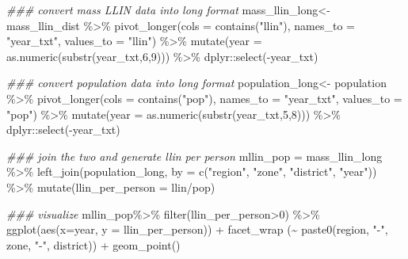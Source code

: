 \documentclass[
  letterpaper,
  DIV=11,
  numbers=noendperiod]{scrreprt}
\newenvironment{Shaded}{\begin{snugshade}}{\end{snugshade}}
\newcommand{\AttributeTok}[1]{\textcolor[rgb]{0.40,0.45,0.13}{#1}}
\newcommand{\DecValTok}[1]{\textcolor[rgb]{0.68,0.00,0.00}{#1}}
\newcommand{\DocumentationTok}[1]{\textcolor[rgb]{0.37,0.37,0.37}{\textit{#1}}}
\newcommand{\FunctionTok}[1]{\textcolor[rgb]{0.28,0.35,0.67}{#1}}
\newcommand{\NormalTok}[1]{\textcolor[rgb]{0.00,0.23,0.31}{#1}}
\newcommand{\OtherTok}[1]{\textcolor[rgb]{0.00,0.23,0.31}{#1}}
\newcommand{\SpecialCharTok}[1]{\textcolor[rgb]{0.37,0.37,0.37}{#1}}
\newcommand{\StringTok}[1]{\textcolor[rgb]{0.13,0.47,0.30}{#1}}
\begin{document}
\begin{Shaded}
\begin{Highlighting}[]
\DocumentationTok{\#\#\# convert mass LLIN data into long format}
\NormalTok{mass\_llin\_long}\OtherTok{\textless{}{-}}\NormalTok{ mass\_llin\_dist }\SpecialCharTok{\%\textgreater{}\%}
  \FunctionTok{pivot\_longer}\NormalTok{(}\AttributeTok{cols =} \FunctionTok{contains}\NormalTok{(}\StringTok{"llin"}\NormalTok{), }\AttributeTok{names\_to =} \StringTok{"year\_txt"}\NormalTok{, }\AttributeTok{values\_to =} \StringTok{"llin"}\NormalTok{) }\SpecialCharTok{\%\textgreater{}\%}
  \FunctionTok{mutate}\NormalTok{(}\AttributeTok{year =} \FunctionTok{as.numeric}\NormalTok{(}\FunctionTok{substr}\NormalTok{(year\_txt,}\DecValTok{6}\NormalTok{,}\DecValTok{9}\NormalTok{))) }\SpecialCharTok{\%\textgreater{}\%}
\NormalTok{  dplyr}\SpecialCharTok{::}\FunctionTok{select}\NormalTok{(}\SpecialCharTok{{-}}\NormalTok{year\_txt)}

\DocumentationTok{\#\#\# convert population data into long format}
\NormalTok{population\_long}\OtherTok{\textless{}{-}}\NormalTok{ population }\SpecialCharTok{\%\textgreater{}\%}
  \FunctionTok{pivot\_longer}\NormalTok{(}\AttributeTok{cols =} \FunctionTok{contains}\NormalTok{(}\StringTok{"pop"}\NormalTok{), }\AttributeTok{names\_to =} \StringTok{"year\_txt"}\NormalTok{, }\AttributeTok{values\_to =} \StringTok{"pop"}\NormalTok{) }\SpecialCharTok{\%\textgreater{}\%}
  \FunctionTok{mutate}\NormalTok{(}\AttributeTok{year =} \FunctionTok{as.numeric}\NormalTok{(}\FunctionTok{substr}\NormalTok{(year\_txt,}\DecValTok{5}\NormalTok{,}\DecValTok{8}\NormalTok{))) }\SpecialCharTok{\%\textgreater{}\%}
\NormalTok{  dplyr}\SpecialCharTok{::}\FunctionTok{select}\NormalTok{(}\SpecialCharTok{{-}}\NormalTok{year\_txt)}

\DocumentationTok{\#\#\# join the two and generate llin per person}
\NormalTok{  mllin\_pop }\OtherTok{=}\NormalTok{ mass\_llin\_long }\SpecialCharTok{\%\textgreater{}\%}
  \FunctionTok{left\_join}\NormalTok{(population\_long, }\AttributeTok{by =} \FunctionTok{c}\NormalTok{(}\StringTok{"region"}\NormalTok{,}
                                    \StringTok{"zone"}\NormalTok{,}
                                    \StringTok{"district"}\NormalTok{,}
                                    \StringTok{"year"}\NormalTok{)) }\SpecialCharTok{\%\textgreater{}\%}
  \FunctionTok{mutate}\NormalTok{(}\AttributeTok{llin\_per\_person  =}\NormalTok{ llin}\SpecialCharTok{/}\NormalTok{pop)}


\DocumentationTok{\#\#\# visualize}
\NormalTok{mllin\_pop}\SpecialCharTok{\%\textgreater{}\%} 
    \FunctionTok{filter}\NormalTok{(llin\_per\_person}\SpecialCharTok{\textgreater{}}\DecValTok{0}\NormalTok{) }\SpecialCharTok{\%\textgreater{}\%}
    \FunctionTok{ggplot}\NormalTok{(}\FunctionTok{aes}\NormalTok{(}\AttributeTok{x=}\NormalTok{year, }\AttributeTok{y =}\NormalTok{ llin\_per\_person)) }\SpecialCharTok{+}
    \FunctionTok{facet\_wrap}\NormalTok{ (}\SpecialCharTok{\textasciitilde{}} \FunctionTok{paste0}\NormalTok{(region, }\StringTok{"{-}"}\NormalTok{, zone, }\StringTok{"{-}"}\NormalTok{, district)) }\SpecialCharTok{+}
    \FunctionTok{geom\_point}\NormalTok{()}
\end{Highlighting}
\end{Shaded}
\end{document}
